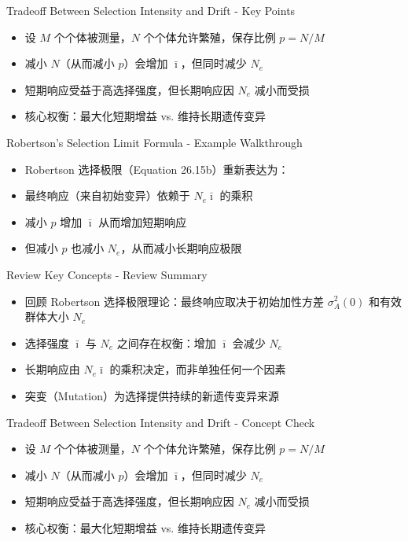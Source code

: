 \documentclass[10pt, aspectratio=169]{ctexbeamer}
\begin{document}
\begin{frame}{Tradeoff Between Selection Intensity and Drift - Key Points}
  \begin{itemize}
    \item 设 $M$ 个个体被测量，$N$ 个个体允许繁殖，保存比例 $p = N/M$
    \item 减小 $N$（从而减小 $p$）会增加 $\bar{\imath}$，但同时减少 $N_e$
    \item 短期响应受益于高选择强度，但长期响应因 $N_e$ 减小而受损
    \item 核心权衡：最大化短期增益 vs. 维持长期遗传变异
  \end{itemize}
\end{frame}

\begin{frame}{Robertson's Selection Limit Formula - Example Walkthrough}
  \begin{itemize}
    \item Robertson 选择极限（Equation 26.15b）重新表达为：
    \item 最终响应（来自初始变异）依赖于 $N_e \bar{\imath}$ 的乘积
    \item 减小 $p$ 增加 $\bar{\imath}$ 从而增加短期响应
    \item 但减小 $p$ 也减小 $N_e$，从而减小长期响应极限
  \end{itemize}
\end{frame}

\begin{frame}{Review Key Concepts - Review Summary}
  \begin{itemize}
    \item 回顾 Robertson 选择极限理论：最终响应取决于初始加性方差 $\sigma_A^2(0)$ 和有效群体大小 $N_e$
    \item 选择强度 $\bar{\imath}$ 与 $N_e$ 之间存在权衡：增加 $\bar{\imath}$ 会减少 $N_e$
    \item 长期响应由 $N_e \bar{\imath}$ 的乘积决定，而非单独任何一个因素
    \item 突变（Mutation）为选择提供持续的新遗传变异来源
  \end{itemize}
\end{frame}

\begin{frame}{Tradeoff Between Selection Intensity and Drift - Concept Check}
  \begin{itemize}
    \item 设 $M$ 个个体被测量，$N$ 个个体允许繁殖，保存比例 $p = N/M$
    \item 减小 $N$（从而减小 $p$）会增加 $\bar{\imath}$，但同时减少 $N_e$
    \item 短期响应受益于高选择强度，但长期响应因 $N_e$ 减小而受损
    \item 核心权衡：最大化短期增益 vs. 维持长期遗传变异
  \end{itemize}
\end{frame}
\end{document}
